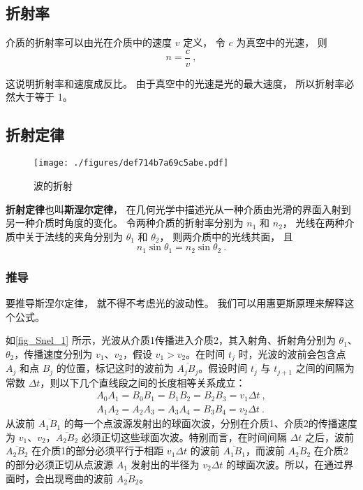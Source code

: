 
\subsection{折射率}
介质的折射率可以由光在介质中的速度 $v$ 定义， 令 $c$ 为真空中的光速， 则
\begin{equation}
n = \frac{c}{v}~,
\end{equation} 

这说明折射率和速度成反比。 由于真空中的光速是光的最大速度， 所以折射率必然大于等于 1。

\subsection{折射定律}
\begin{figure}[ht]
\centering
\texttt{[image: ./figures/def714b7a69c5abe.pdf]}
\caption{波的折射} \label{fig_Snel_1}
\end{figure}
\textbf{折射定律}也叫\textbf{斯涅尔定律}， 在几何光学中描述光从一种介质由光滑的界面入射到另一种介质时角度的变化。 令两种介质的折射率分别为 $n_1$ 和 $n_2$， 光线在两种介质中关于法线的夹角分别为 $\theta_1$ 和 $\theta_2$， 则两介质中的光线共面， 且
\begin{equation}
n_1 \sin\theta_1 = n_2 \sin\theta_2~.
\end{equation}


\subsubsection{推导}
要推导斯涅尔定律， 就不得不考虑光的波动性。 我们可以用惠更斯原理来解释这个公式。

如\autoref{fig_Snel_1} 所示，光波从介质1传播进入介质2，其入射角、折射角分别为 $\theta_1$、$\theta_2$，传播速度分别为 $v_1$、$v_2$，假设 $v_1>v_2$。在时间 $t_{j}$ 时，光波的波前会包含点 $A_{j}$ 和点 $B_{j}$ 的位置，标记这时的波前为 $\overline {A_{j}B_{j}}$。假设时间 $t_{j}$ 与 $t_{{j+1}}$ 之间的间隔为常数 $\Delta t$，则以下几个直线段之间的长度相等关系成立：
\begin{equation}
\begin{aligned}
A_{0}A_{1}=B_{0}B_{1}=B_{1}B_{2}=B_{2}B_{3}=v_{1}\Delta t ~,\\
A_{1}A_{2}=A_{2}A_{3}=A_{3}A_{4}=B_{3}B_{4}=v_{2}\Delta t~.
\end{aligned}
\end{equation}
从波前 $\overline {A_{1}B_{1}}$ 的每一个点波源发射出的球面次波，分别在介质1、介质2的传播速度为 $v_1$、$v_2$，$\overline {A_{2}B_{2}}$ 必须正切这些球面次波。特别而言，在时间间隔 $\Delta t$ 之后，波前 $\overline {A_{2}B_{2}}$ 在介质1的部分必须平行于相距 $v_{1}\Delta t$ 的波前 $\overline {A_{1}B_{1}}$，而波前 $\overline {A_{2}B_{2}}$ 在介质2的部分必须正切从点波源 $A_{1}$ 发射出的半径为 $v_{2}\Delta t$ 的球面次波。所以，在通过界面时，会出现弯曲的波前 $\overline {A_{2}B_{2}}$。

